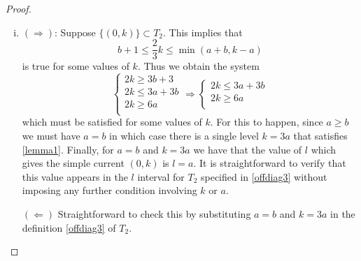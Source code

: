 \documentclass[a4paper,11pt]{article}
\theoremstyle{plain}
\theoremstyle{definition}
\begin{document}
\begin{proof}
\begin{enumerate}[i),wide, labelwidth=!, labelindent=0pt]
    Now suppose  $\{(0,k)\}\subseteq T_3$, then the following holds
    \begin{equation}
        2\leq \frac{2}{3}k \leq \operatorname{min}(k-a-1,2b-2)
    \end{equation}
    which gives the system
    \begin{equation}
         \left\{\begin{array}{lr}
     2k\geq 6 \\
        k \geq  3a+3\\
        k \leq 3b-3 \\
        \end{array}\right. 
    \end{equation}
    Since $a\geq b$ the last two inequalities give a contradiction, hence  $\{(0,k)\}\nsubseteq T_3$.
    \item 
    $(\Rightarrow)$: Suppose $\{(0,k)\}\subset T_2$. This implies that
    \begin{equation}
        b+1 \leq \frac{2}{3}k \leq \operatorname{min}(a+b,k-a)
    \end{equation}
    is true for some values of $k$. Thus we obtain the system
    \begin{equation}\label{lemma1}
         \left\{\begin{array}{lr}
     2k\geq 3b+3\\
        2k \leq  3a+3b\\
        2k \geq 6a \\
        \end{array}\right. 
        \Longrightarrow  \left\{\begin{array}{lr}
        2k \leq  3a+3b\\
        2k \geq 6a \\
        \end{array}\right.
    \end{equation}
    which must be satisfied for some values of $k$. For this to happen, since $a\geq b$ we must have $a=b$ in which case there is a single level $k=3a$ that satisfies \eqref{lemma1}. Finally, for $a=b$ and $k=3a$ we have that the value of $l$ which gives the simple current $(0,k)$ is $l=a$. It is straightforward to verify that this value appears in the $l$ interval for $T_2$ specified in \eqref{offdiag3} without imposing any further condition involving $k$ or $a$.
    
    $(\Leftarrow)$ Straightforward to check this by substituting $a=b$ and $k=3a$ in the definition \eqref{offdiag3} of $T_2$.
    \end{enumerate}
\end{proof}
\end{document}
